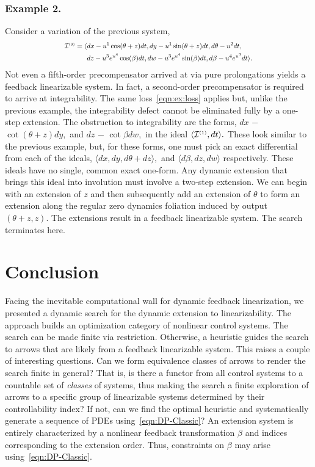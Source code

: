 \documentclass[a4paper]{ifacconf}
\begin{document}
\subsubsection{Example 2.}
Consider a variation of the previous system,
\[
  \scalebox{0.8}{\mbox{\ensuremath{\displaystyle%
    \begin{aligned}
    \Ideal{I}^{\smash{\scriptscriptstyle(0)}}
      = \langle
        & dx - u^1\cos(\theta + z) dt,
          dy - u^1\sin(\theta + z) dt,
          d\theta - u^2 dt,\\
        & dz - u^3 e^{u^4} \cos(\beta) dt,
        dw - u^3 e^{u^4} \sin(\beta) dt,
        d\beta - u^4 e^{u^3} dt
      \rangle.
    \end{aligned}
  }}}
\]
Not even a fifth-order precompensator arrived at via pure prolongations yields a feedback linearizable system.
In fact, a second-order precompensator is required to arrive at integrability.
%
The same loss~\eqref{eqn:ex:loss} applies but, unlike the previous example, the integrability defect cannot be eliminated fully by a one-step extension.
The obstruction to integrability are the forms, \(dx\) \(-\) \(\cot(\theta + z) dy,\) and \(dz\) \(-\) \(\cot\beta dw,\) in the ideal \(\langle \mathcal{I}^{\smash{\scriptscriptstyle(1)}}, dt \rangle.\)
These look similar to the previous example, but, for these forms, one must pick an exact differential from each of the ideals, \(\langle dx, dy, d\theta + dz \rangle,\) and \(\langle d\beta, dz, dw\rangle\) respectively.
These ideals have no single, common exact one-form.
Any dynamic extension that brings this ideal into involution must involve a two-step extension.
We can begin with an extension of \(z\) and then subsequently add an extension of \(\theta\) to form an extension along the regular zero dynamics foliation induced by output \((\theta + z, z).\)
The extensions result in a feedback linearizable system.
The search terminates here.

\section{Conclusion}
Facing the inevitable computational wall for dynamic feedback linearization, we presented a dynamic search for the dynamic extension to linearizability.
The approach builds an optimization category of nonlinear control systems.
The search can be made finite via restriction.
Otherwise, a heuristic guides the search to arrows that are likely from a feedback linearizable system.
This raises a couple of interesting questions.
Can we form equivalence classes of arrows to render the search finite in general?
That is, is there a functor from all control systems to a countable set of \emph{classes} of systems, thus making the search a finite exploration of arrows to a specific group of linearizable systems determined by their controllability index?
If not, can we find the optimal heuristic and systematically generate a sequence of PDEs using~\eqref{eqn:DP-Classic}?
An extension system is entirely characterized by a nonlinear feedback transformation \(\beta\) and indices corresponding to the extension order.
Thus, constraints on \(\beta\) may arise using~\eqref{eqn:DP-Classic}.
\end{document}

